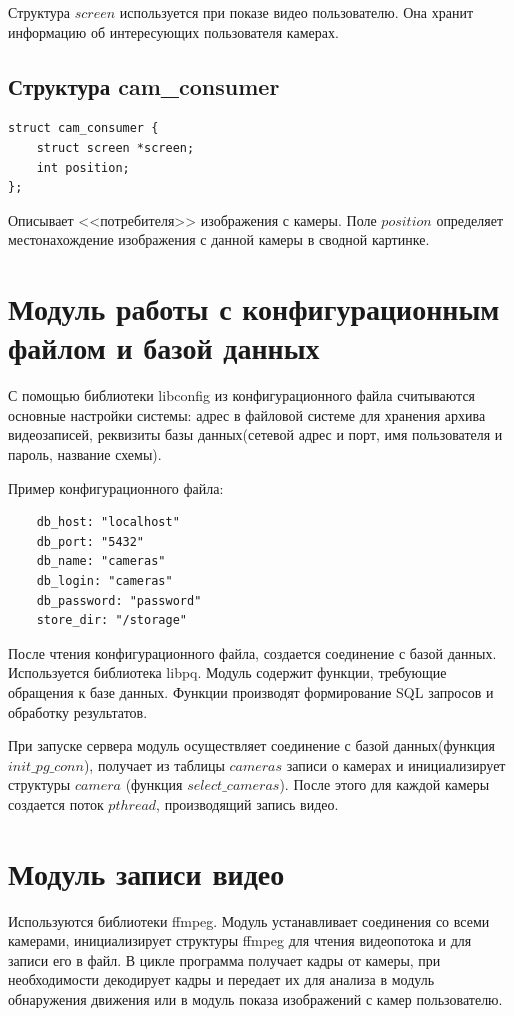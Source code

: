 Структура $screen$ используется при показе видео пользователю.
Она хранит информацию об интересующих пользователя камерах.

\subsection{Структура cam\_consumer}
\begin{verbatim}
struct cam_consumer {
    struct screen *screen;
    int position;
};
\end{verbatim}

Описывает <<потребителя>> изображения с камеры.
Поле $position$ определяет местонахождение изображения с данной камеры в сводной картинке.

\section{Модуль работы с конфигурационным файлом и базой данных}

С помощью библиотеки libconfig из конфигурационного файла считываются основные настройки системы:
адрес в файловой системе для хранения архива видеозаписей,
реквизиты базы данных(сетевой адрес и порт, имя пользователя и пароль, название схемы).

Пример конфигурационного файла:
\begin{verbatim}
	db_host: "localhost"
	db_port: "5432"
	db_name: "cameras"
	db_login: "cameras"
	db_password: "password"
	store_dir: "/storage"
\end{verbatim}

После чтения конфигурационного файла, создается соединение с базой данных.
Используется библиотека libpq.
Модуль содержит функции, требующие обращения к базе данных.
Функции производят формирование SQL запросов и обработку результатов.

При запуске сервера модуль осуществляет соединение с базой данных(функция $init\_pg\_conn$),
получает из таблицы $cameras$ записи о камерах и инициализирует структуры $camera$
(функция $select\_cameras$). После этого для каждой камеры создается поток $pthread$,
производящий запись видео.

\section{Модуль записи видео}
Используются библиотеки ffmpeg.
Модуль устанавливает соединения со всеми камерами, инициализирует структуры ffmpeg для
чтения видеопотока и для записи его в файл. В цикле программа получает кадры от камеры, при
необходимости декодирует кадры и передает их для анализа в модуль обнаружения движения
или в модуль показа изображений с камер пользователю.

